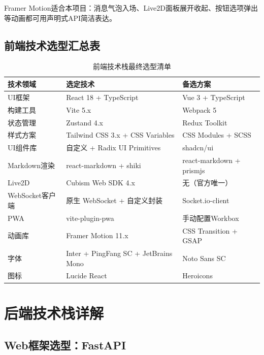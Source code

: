 \documentclass[fontset=mac,a4paper,11pt]{ctexart}
\begin{document}
Framer Motion适合本项目：消息气泡入场、Live2D面板展开收起、按钮选项弹出等动画都可用声明式API简洁表达。

\subsection{前端技术选型汇总表}

\begin{table}[H]
\centering
\caption{前端技术栈最终选型清单}
\label{tab:frontend-summary}
\begin{tabular}{L{3.5cm}L{4cm}L{4.5cm}}
\toprule
\textbf{技术领域} & \textbf{选定技术} & \textbf{备选方案} \\
\midrule
{}
UI框架 & React 18 + TypeScript & Vue 3 + TypeScript \\
构建工具 & Vite 5.x & Webpack 5 \\
状态管理 & Zustand 4.x & Redux Toolkit \\
样式方案 & Tailwind CSS 3.x + CSS Variables & CSS Modules + SCSS \\
UI组件库 & 自定义 + Radix UI Primitives & shadcn/ui \\
Markdown渲染 & react-markdown + shiki & react-markdown + prismjs \\
Live2D & Cubism Web SDK 4.x & 无（官方唯一） \\
WebSocket客户端 & 原生 WebSocket + 自定义封装 & Socket.io-client \\
PWA & vite-plugin-pwa & 手动配置Workbox \\
动画库 & Framer Motion 11.x & CSS Transition + GSAP \\
字体 & Inter + PingFang SC + JetBrains Mono & Noto Sans SC \\
图标 & Lucide React & Heroicons \\
\bottomrule
\end{tabular}
\end{table}

\section{后端技术栈详解}

\subsection{Web框架选型：FastAPI}
\end{document}
